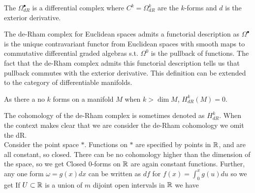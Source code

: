 \documentclass{article}
\begin{document}
\begin{definition}
	The  $\Omega^\bullet_{dR}$ is a differential complex where $C^k = \Omega^k_{dR}$ are the $k$-forms and $d$ is the exterior derivative. 
\end{definition}


\begin{remark}
		The de-Rham complex for Euclidean spaces admits a functorial description as $\Omega^\bullet$ is the unique contravariant functor from Euclidean spaces with smooth maps to commutative differential graded algebras s.t. $\Omega^0$ is the pullback of functions. The fact that the de-Rham complex admits this functorial description tells us that pullback commutes with the exterior derivative. This definition can be extended to the category of differentiable manifolds. 
\end{remark}

\begin{remark}
	As there a no $k$ forms on a manifold $M$ when $k > \dim M$, $H^k_{dR}(M)=0$.
\end{remark}

\begin{example}
	The cohomology of the de-Rham complex is sometimes denoted as $H^k_{dR}$. When the context makes clear that we are consider the de-Rham cohomology we omit the dR. \\
	Consider the point space $\ast$. Functions on $\ast$ are specified by points in $\mathbb{R}$, and are all constant, so closed. There can be no cohomology higher than the dimension of the space, so we get 
	Closed $0$-forms on $\mathbb{R}$ are again constant functions. Further, any one form $\omega = g(x)dx$ can be written as $df$ for $f(x) = \int_0^x g(u) du$ so we get 
	If $U\subset \mathbb{R}$ is a union of $m$ dijoint open intervals in $\mathbb{R}$ we have 
\end{example}
\end{document}
